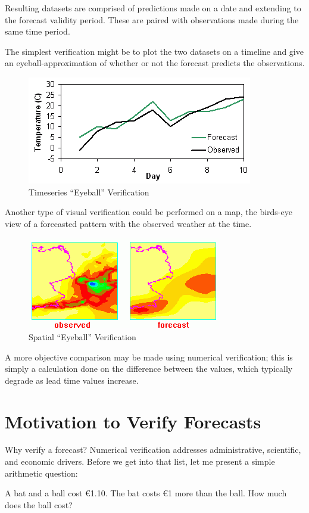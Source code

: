 \documentclass[logos,parttoc,morelanguage=french,morelanguage=german]{orsay-memoire}
\begin{document}
Resulting datasets are comprised of predictions made on a date and extending to the forecast validity period. These are paired with observations made during the same time period.

The simplest verification might be to plot the two datasets on a timeline and give an eyeball-approximation of whether or not the forecast predicts the observations.
\begin{figure}[hb]
\centering
\includegraphics[width=0.45\linewidth]{images/eyeballtimeseries.png}
  \caption{Timeseries ``Eyeball'' Verification}
  \label{fig:eyeballSeries}
\end{figure}


Another type of visual verification could be performed on a map, the birds-eye view of a forecasted pattern with the observed weather at the time.
\begin{figure}[hb]
\centering
\includegraphics[width=0.45\linewidth]{images/DWDmaps.png}
  \caption{Spatial ``Eyeball'' Verification}
  \label{fig:eyeballMap}
\end{figure}

A more objective comparison may be made using numerical verification; this is simply a calculation done on the difference between the values, which typically degrade as lead time values increase.



\section{Motivation to Verify Forecasts}

Why verify a forecast? Numerical verification addresses administrative, scientific, and economic drivers. Before we get into that list, let me present a simple arithmetic question:

A bat and a ball cost €1.10. The bat costs €1 more than the ball. How much does the ball cost?
\end{document}
